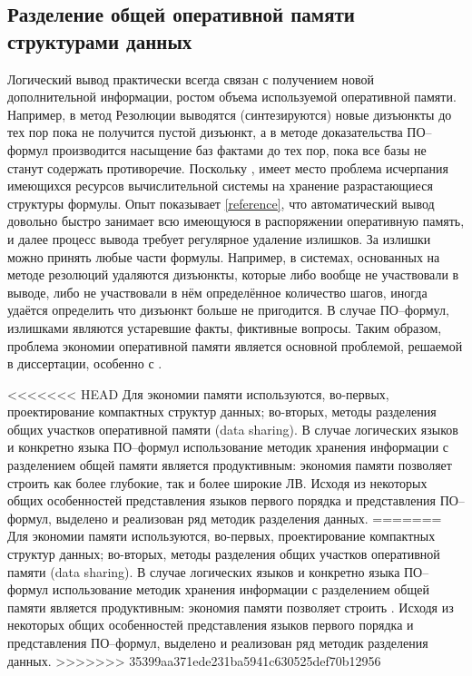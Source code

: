 \subsection{Разделение общей оперативной памяти структурами данных}
Логический вывод практически всегда связан с получением новой дополнительной информации, ростом объема используемой оперативной памяти. Например, в метод Резолюции выводятся (синтезируются) новые дизъюнкты до тех пор пока не получится пустой дизъюнкт, а в методе доказательства ПО--формул производится насыщение баз фактами до тех пор, пока все базы не станут содержать противоречие. Поскольку , имеет место проблема исчерпания имеющихся ресурсов вычислительной системы на хранение разрастающиеся структуры формулы. Опыт показывает \ref{reference}, что автоматический вывод довольно быстро занимает всю имеющуюся в распоряжении оперативную память, и далее процесс вывода требует регулярное удаление излишков. За излишки можно принять любые части формулы. Например, в системах, основанных на методе резолюций удаляются дизъюнкты, которые либо вообще не участвовали в выводе, либо не участвовали в нём определённое количество шагов, иногда удаётся  определить что дизъюнкт больше не пригодится. В случае ПО--формул, излишками являются устаревшие факты, фиктивные вопросы. Таким образом, проблема экономии оперативной памяти является основной проблемой, решаемой в диссертации, особенно с .

<<<<<<< HEAD
Для экономии памяти используются, во-первых, проектирование компактных структур данных; во-вторых, методы разделения общих участков оперативной памяти (data sharing). В случае логических языков и конкретно языка ПО--формул использование методик хранения информации с разделением общей памяти является продуктивным: экономия памяти позволяет строить как более глубокие, так и более широкие ЛВ. Исходя из некоторых общих особенностей представления языков первого порядка и представления ПО--формул, выделено и реализован ряд методик разделения данных.
=======
Для экономии памяти используются, во-первых, проектирование компактных структур данных; во-вторых, методы разделения общих участков оперативной памяти (data sharing). В случае логических языков и конкретно языка ПО--формул использование методик хранения информации с разделением общей памяти является продуктивным: экономия памяти позволяет строить . Исходя из некоторых общих особенностей представления языков первого порядка и представления ПО--формул, выделено и реализован ряд методик разделения данных.
>>>>>>> 35399aa371ede231ba5941c630525def70b12956

